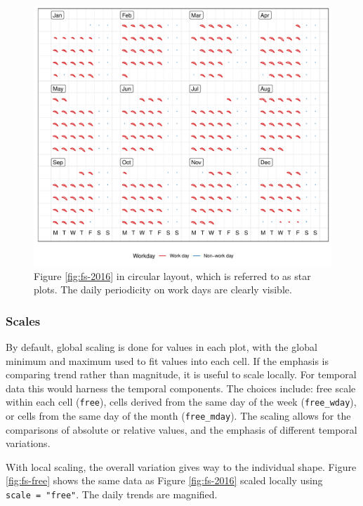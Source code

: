 \documentclass[12pt]{article}
\begin{document}
\begin{figure}

{\centering \includegraphics[width=\textwidth]{figure/fs-polar-1} 

}

\caption{Figure \ref{fig:fs-2016} in circular layout, which is referred to as star plots. The daily periodicity on work days are clearly visible.}\label{fig:fs-polar}
\end{figure}

\hypertarget{scales}{%
\subsubsection{Scales}\label{scales}}

By default, global scaling is done for values in each plot, with the
global minimum and maximum used to fit values into each cell. If the
emphasis is comparing trend rather than magnitude, it is useful to scale
locally. For temporal data this would harness the temporal components.
The choices include: free scale within each cell (\texttt{free}), cells
derived from the same day of the week (\texttt{free\_wday}), or cells
from the same day of the month (\texttt{free\_mday}). The scaling allows
for the comparisons of absolute or relative values, and the emphasis of
different temporal variations.

With local scaling, the overall variation gives way to the individual
shape. Figure \ref{fig:fs-free} shows the same data as Figure
\ref{fig:fs-2016} scaled locally using \texttt{scale\ =\ "free"}. The
daily trends are magnified.
\end{document}
